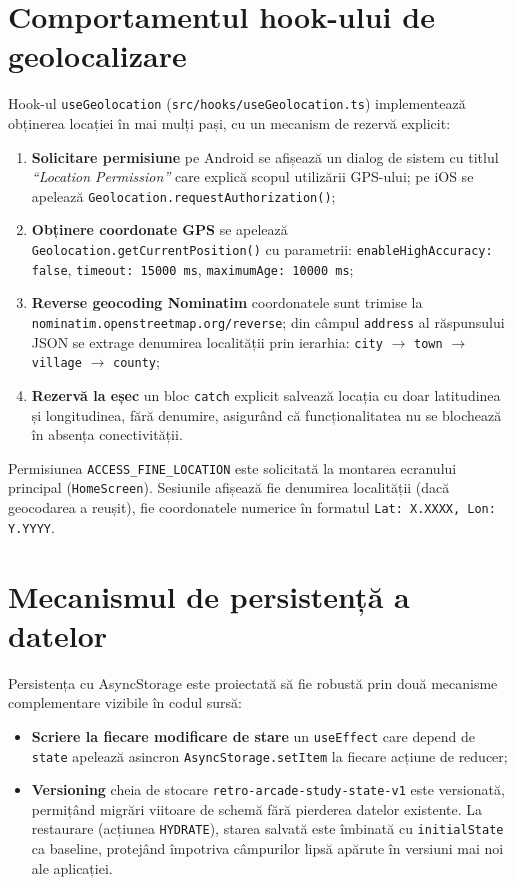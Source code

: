 \documentclass[12pt, a4paper, twoside]{report}
\numberwithin{equation}{section}
\begin{document}
\section{Comportamentul hook-ului de geolocalizare}

Hook-ul \texttt{useGeolocation} (\texttt{src/hooks/useGeolocation.ts}) implementează
obținerea locației în mai mulți pași, cu un mecanism de rezervă explicit:

\begin{enumerate}
  \item \textbf{Solicitare permisiune} \textemdash{} pe Android se afișează un
    dialog de sistem cu titlul \textit{``Location Permission''} care explică scopul
    utilizării GPS-ului; pe iOS se apelează \texttt{Geolocation.requestAuthorization()};
  \item \textbf{Obținere coordonate GPS} \textemdash{} se apelează
    \texttt{Geolocation.getCurrentPosition()} cu parametrii:
    \texttt{enableHighAccuracy: false}, \texttt{timeout: 15000 ms},
    \texttt{maximumAge: 10000 ms};
  \item \textbf{Reverse geocoding Nominatim} \textemdash{} coordonatele sunt
    trimise la \texttt{nominatim.openstreetmap.org/reverse}; din câmpul
    \texttt{address} al răspunsului JSON se extrage denumirea localității prin
    ierarhia: \texttt{city} $\rightarrow$ \texttt{town} $\rightarrow$
    \texttt{village} $\rightarrow$ \texttt{county};
  \item \textbf{Rezervă la eșec} \textemdash{} un bloc \texttt{catch} explicit
    salvează locația cu doar latitudinea și longitudinea, fără denumire,
    asigurând că funcționalitatea nu se blochează în absența conectivității.
\end{enumerate}

Permisiunea \texttt{ACCESS\_FINE\_LOCATION} este solicitată la montarea ecranului
principal (\texttt{HomeScreen}). Sesiunile afișează fie denumirea localității (dacă
geocodarea a reușit), fie coordonatele numerice în formatul
\texttt{Lat: X.XXXX, Lon: Y.YYYY}.

\section{Mecanismul de persistență a datelor}

Persistența cu AsyncStorage este proiectată să fie robustă prin două
mecanisme complementare vizibile în codul sursă:
\begin{itemize}
  \item \textbf{Scriere la fiecare modificare de stare} \textemdash{} un \texttt{useEffect}
    care depend de \texttt{state} apelează asincron \texttt{AsyncStorage.setItem}
    la fiecare acțiune de reducer;
  \item \textbf{Versioning} \textemdash{} cheia de stocare \texttt{retro-arcade-study-state-v1}
    este versionată, permițând migrări viitoare de schemă fără pierderea datelor
    existente. La restaurare (acțiunea \texttt{HYDRATE}), starea salvată este
    îmbinată cu \texttt{initialState} ca baseline, protejând împotriva câmpurilor
    lipsă apărute în versiuni mai noi ale aplicației.
\end{itemize}
\end{document}
